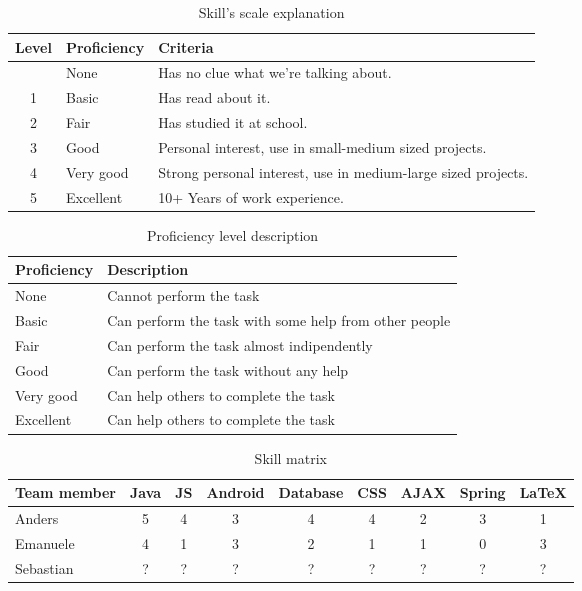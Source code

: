 \begin{table}[h]
\begin{center}
\begin{tabular}{ | c | l | l | }
  \hline
  Level & Proficiency & Criteria \\
  \hline\noalign{\smallskip}\noalign{\smallskip}\hline
  0 & None		& Has no clue what we're talking about. \\
  1 & Basic		& Has read about it.\\
  2 & Fair		& Has studied it at school.\\
  3 & Good		& Personal interest, use in small-medium sized projects.\\
  4 & Very good	& Strong personal interest, use in medium-large sized projects. \\
  5 & Excellent	& 10+ Years of work experience. \\
  \hline
\end{tabular}
\end{center}
\caption{Skill's scale explanation}
\label{table:skillscale}
\end{table}

\begin{table}[h]
\begin{center}
\begin{tabular}{ | l | l | }
  \hline
  Proficiency & Description \\
  \hline\noalign{\smallskip}\noalign{\smallskip}\hline
  None		& Cannot perform the task \\
  Basic		& Can perform the task with some help from other people \\
  Fair		& Can perform the task almost indipendently \\
  Good		& Can perform the task without any help \\
  Very good	& Can help others to complete the task \\
  Excellent	& Can help others to complete the task \\
  \hline
\end{tabular}
\end{center}
\caption{Proficiency level description}
\label{table:proficiency}
\end{table}

\begin{table}[h]
\begin{center}
\begin{tabular}{ | l | c | c | c | c | c | c | c | c | }
  \hline
  Team member & Java & JS & Android & Database & CSS & AJAX & Spring & LaTeX \\
  \hline\noalign{\smallskip}\noalign{\smallskip}\hline
  Anders & 5 & 4 & 3 & 4 & 4 & 2 & 3 & 1 \\
  Emanuele & 4 & 1 & 3 & 2 & 1 & 1 & 0 & 3 \\
  Sebastian & ? & ? & ? & ? & ? & ? & ? & ? \\
  \hline
\end{tabular}
\end{center}
\caption{Skill matrix}
\label{table:skillmatrix}
\end{table}

